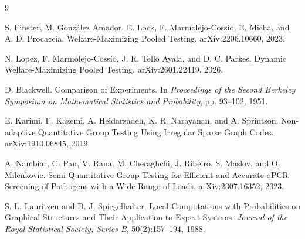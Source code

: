 \documentclass[11pt]{article}
\begin{document}
\small
\begin{thebibliography}{9}

S. Finster, M. Gonz\'alez Amador, E. Lock, F. Marmolejo-Coss\'io,
E. Micha, and A. D. Procaccia.
\newblock Welfare-Maximizing Pooled Testing.
\newblock arXiv:2206.10660, 2023.

N. Lopez, F. Marmolejo-Coss\'io, J. R. Tello Ayala, and D. C. Parkes.
\newblock Dynamic Welfare-Maximizing Pooled Testing.
\newblock arXiv:2601.22419, 2026.

D. Blackwell.
\newblock Comparison of Experiments.
\newblock In \emph{Proceedings of the Second Berkeley Symposium on Mathematical
Statistics and Probability}, pp. 93--102, 1951.

E. Karimi, F. Kazemi, A. Heidarzadeh, K. R. Narayanan, and A. Sprintson.
\newblock Non-adaptive Quantitative Group Testing Using Irregular Sparse Graph
Codes.
\newblock arXiv:1910.06845, 2019.

A. Nambiar, C. Pan, V. Rana, M. Cheraghchi, J. Ribeiro, S. Maslov, and
O. Milenkovic.
\newblock Semi-Quantitative Group Testing for Efficient and Accurate qPCR
Screening of Pathogens with a Wide Range of Loads.
\newblock arXiv:2307.16352, 2023.

S. L. Lauritzen and D. J. Spiegelhalter.
\newblock Local Computations with Probabilities on Graphical Structures and
Their Application to Expert Systems.
\newblock \emph{Journal of the Royal Statistical Society, Series B},
50(2):157--194, 1988.

\end{thebibliography}
\end{document}
